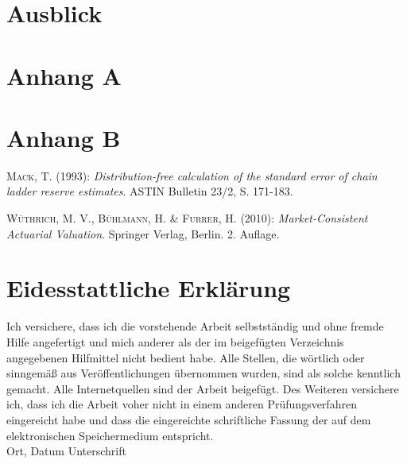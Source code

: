 \documentclass[
  11pt,
  letterpaper,
  DIV=11,
  numbers=noendperiod]{scrartcl}
\numberwithin{equation}{section} %
\begin{document}
\section{Ausblick}
\newpage


\section*{Anhang A}

\newpage


\section*{Anhang B}

\newpage



\begingroup
{}
\renewcommand*\refname{Literaturverzeichnis}

\begin{thebibliography}{----}

\textsc{Mack}, T. (1993): {\it Distribution-free calculation of the standard error of chain ladder reserve estimates}. ASTIN Bulletin 23/2, S. 171-183.

\textsc{Wüthrich}, M. V., \textsc{Bühlmann}, H. \& \textsc{Furrer}, H. (2010): {\it Market-Consistent Actuarial Valuation}. Springer Verlag, Berlin. 2. Auflage.
\end{thebibliography}
\endgroup

\newpage


\section*{Eidesstattliche Erklärung}

\glqq Ich versichere, dass ich die vorstehende Arbeit selbstständig und
ohne fremde Hilfe angefertigt und mich anderer als der im beigefügten
Verzeichnis angegebenen Hilfmittel nicht bedient habe. Alle Stellen, die
wörtlich oder sinngemäß aus Veröffentlichungen übernommen wurden, sind als
solche kenntlich gemacht. Alle Internetquellen sind der Arbeit beigefügt.
Des Weiteren versichere ich, dass ich die Arbeit voher nicht in einem anderen
Prüfungsverfahren eingereicht habe und dass die eingereichte schriftliche Fassung
der auf dem elektronischen Speichermedium entspricht.\grqq 
~\\[20mm]
Ort, Datum\hspace{4cm} Unterschrift
\end{document}
